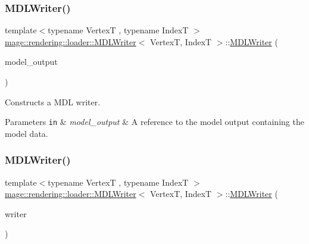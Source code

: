 \subsubsection{\texorpdfstring{M\+D\+L\+Writer()}{MDLWriter()}\hspace{0.1cm}{\footnotesize\ttfamily [1/3]}}
{\footnotesize\ttfamily template$<$typename VertexT , typename IndexT $>$ \\
\mbox{\hyperlink{classmage_1_1rendering_1_1loader_1_1_m_d_l_writer}{mage\+::rendering\+::loader\+::\+M\+D\+L\+Writer}}$<$ VertexT, IndexT $>$\+::\mbox{\hyperlink{classmage_1_1rendering_1_1loader_1_1_m_d_l_writer}{M\+D\+L\+Writer}} (\begin{DoxyParamCaption}\item[{const \mbox{\hyperlink{structmage_1_1rendering_1_1_model_output}{Model\+Output}}$<$ VertexT, IndexT $>$ \&}]{model\+\_\+output }\end{DoxyParamCaption})\hspace{0.3cm}{\ttfamily [explicit]}}

Constructs a M\+DL writer.


\begin{DoxyParams}[1]{Parameters}
\mbox{\tt in}  & {\em model\+\_\+output} & A reference to the model output containing the model data. \\
\hline
\end{DoxyParams}
\mbox{\label{classmage_1_1rendering_1_1loader_1_1_m_d_l_writer_a475ff3efdba707303052bae28d3ba85b}} 
\subsubsection{\texorpdfstring{M\+D\+L\+Writer()}{MDLWriter()}\hspace{0.1cm}{\footnotesize\ttfamily [2/3]}}
{\footnotesize\ttfamily template$<$typename VertexT , typename IndexT $>$ \\
\mbox{\hyperlink{classmage_1_1rendering_1_1loader_1_1_m_d_l_writer}{mage\+::rendering\+::loader\+::\+M\+D\+L\+Writer}}$<$ VertexT, IndexT $>$\+::\mbox{\hyperlink{classmage_1_1rendering_1_1loader_1_1_m_d_l_writer}{M\+D\+L\+Writer}} (\begin{DoxyParamCaption}\item[{const \mbox{\hyperlink{classmage_1_1rendering_1_1loader_1_1_m_d_l_writer}{M\+D\+L\+Writer}}$<$ VertexT, IndexT $>$ \&}]{writer }\end{DoxyParamCaption})\hspace{0.3cm}{\ttfamily [delete]}}

